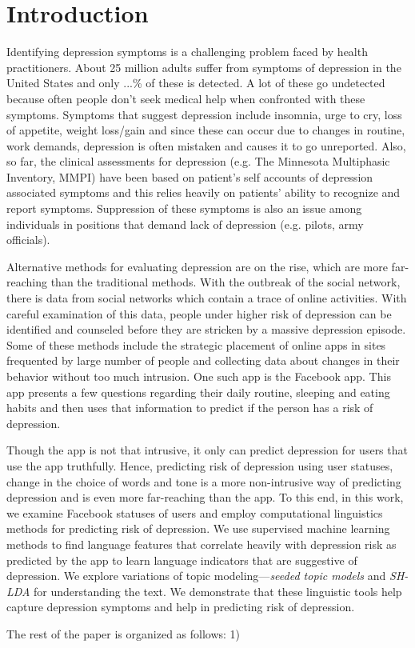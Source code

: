 \section{Introduction}
\label{sec:introduction}

Identifying depression symptoms is a challenging problem faced by health practitioners. About 25 million adults suffer from symptoms of depression in the United States \cite{} and only ...\% of these is detected. A lot of these go undetected because often people don't seek medical help when confronted with these symptoms. Symptoms that suggest depression include insomnia, urge to cry, loss of appetite, weight loss/gain and since these can occur due to changes in routine, work demands, depression is often mistaken and causes it to go unreported. Also, so far, the clinical assessments for depression (e.g. The Minnesota Multiphasic Inventory, MMPI) have been based on patient's self accounts of depression associated symptoms and this relies heavily on patients' ability to recognize and report symptoms. Suppression of these symptoms is also an issue among individuals in positions that demand lack of depression (e.g. pilots, army officials). 

Alternative methods for evaluating depression are on the rise, which are more far-reaching than the traditional methods. With the outbreak of the social network, there is data from social networks which contain a trace of online activities. With careful examination of this data, people under higher risk of depression can be identified and counseled before they are stricken by a massive depression episode. Some of these methods include the strategic placement of online apps in sites frequented by large number of people and collecting data about changes in their behavior without too much intrusion. One such app is the Facebook app. This app presents a few questions regarding their daily routine, sleeping and eating habits and then uses that information to predict if the person has a risk of depression. 


Though the app is not that intrusive, it only can predict depression for users that use the app truthfully. Hence, predicting risk of depression using user statuses, change in the choice of words and tone is a more non-intrusive way of predicting depression and is even more far-reaching than the app. To this end, in this work, we examine Facebook statuses of users and employ computational linguistics methods for predicting risk of depression. We use supervised machine learning methods to find language features that correlate heavily with depression risk as predicted by the app to learn language indicators that are suggestive of depression.
We explore variations of topic modeling---\textit{seeded topic models} \cite{} and \textit{SH-LDA} \cite{} for understanding the text. We demonstrate that these linguistic tools help capture depression symptoms and help in predicting risk of depression.

The rest of the paper is organized as follows: 1) 

